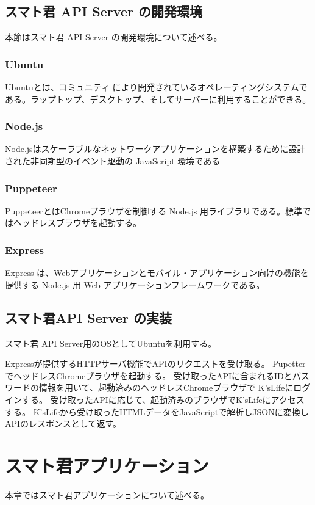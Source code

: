 \documentclass[a4j,12pt,onecolumn,oneside,titlepage,openany,final]{jreport}
\begin{document}
\section{スマト君 API Server の開発環境}\label{rihabiri_jisso}
本節はスマト君 API Server の開発環境について述べる。
\subsection{Ubuntu}
Ubuntu\cite{ubuntu}とは、コミュニティ により開発されているオペレーティングシステムである。ラップトップ、デスクトップ、そしてサーバーに利用することができる。
\subsection{Node.js}
Node.js\cite{nodejs}はスケーラブルなネットワークアプリケーションを構築するために設計された非同期型のイベント駆動の JavaScript 環境である
\subsection{Puppeteer}
Puppeteer\cite{puppeteer}とはChromeブラウザを制御する Node.js 用ライブラリである。標準ではヘッドレスブラウザを起動する。
\subsection{Express}
Express\cite{express} は、Webアプリケーションとモバイル・アプリケーション向けの機能を提供する Node.js 用 Web アプリケーションフレームワークである。

\section{スマト君API Server の実装}\label{rihabiri_jisso}
スマト君 API Server用のOSとしてUbuntuを利用する。

Expressが提供するHTTPサーバ機能でAPIのリクエストを受け取る。
PupetterでヘッドレスChromeブラウザを起動する。
受け取ったAPIに含まれるIDとパスワードの情報を用いて、起動済みのヘッドレスChromeブラウザで K'sLifeにログインする。
受け取ったAPIに応じて、起動済みのブラウザでK'sLifeにアクセスする。
K'sLifeから受け取ったHTMLデータをJavaScriptで解析しJSONに変換しAPIのレスポンスとして返す。


\chapter{スマト君アプリケーション}\label{smartphone}
本章ではスマト君アプリケーションについて述べる。
\end{document}
